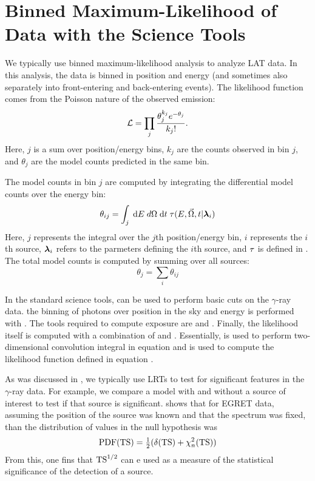 \section{Binned Maximum-Likelihood of  Data with the Science Tools}

We typically use binned maximum-likelihood analysis to analyze \ac{LAT}
data.  In this analysis, the data is binned in position and energy (and
sometimes also separately into front-entering and back-entering events).
The likelihood function comes from the Poisson nature of the observed
emission:
\begin{equation}\eqnlabel{poisson_likelihood_counts_model}
  \likelihood=\prod_j \frac{\theta_j^{k_j} e^{-\theta_j}}{k_j!}.
\end{equation}
Here, $j$ is a sum over position/energy bins,
$k_j$ are the counts observed in bin $j$, and 
$\theta_j$ are the model counts predicted in the same bin.


The model counts in bin $j$ are computed by integrating the differential
model counts over the energy bin:
  \begin{equation}
    \theta_{ij} = \int_j \; \text{d}E \; 
    d\Omega \; \text{d}t \; 
    \tau(E,\vec\Omega,t|\boldsymbol{\lambda}_i)
  \end{equation}
Here, $j$ represents the integral over the $j$th position/energy bin,
$i$ represents the $i$th source, $\boldsymbol{\lambda}_i$ refers to the
parmeters defining the $i$th source,
and $\tau$ is defined in  
. The total model counts
is computed by summing over all sources:
\begin{equation}
  \theta_j = \sum_i \theta_{ij}
\end{equation}

In the standard \fermi science tools, \gtbin can be used to perform
basic cuts on the $\gamma$-ray data.  the binning of photons over
position in the sky and energy is performed with \gtbin.  The tools
required to compute exposure are \gtltcube and \gtexpcubetwo. Finally,
the likelihood itself is computed with a combination of \gtsrcmaps and
\gtlike.  Essentially, \gtsrcmaps is used to perform two-dimensional
convolution integral in equation  and
\gtlike is used to compute the likelihood function defined in equation
.

As was discussed in ,
we typically use \acp{LRT} to test for significant features in
the $\gamma$-ray data.  For example, we compare a model with and
without a source of interest to test if that source is significant.
\cite{mattox_1996a_likelihood-analysis} shows that for \ac{EGRET} data,
assuming the position of the source was known and that the spectrum was
fixed, than the distribution of \ts values in the null hypothesis was
\begin{equation}
  \text{PDF}(\mathrm{TS}) = \tfrac{1}{2} (\delta(\mathrm{TS}) + \chi^2_n(\mathrm{TS}))
\end{equation}
From this, one fins that $\mathrm{TS}^{1/2}$ can e used as a measure of the
statistical significance of the detection of a source.

